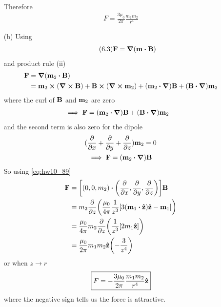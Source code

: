 \documentclass[../main.tex]{subfiles}
\begin{document}
\begin{itemize}
\begin{align*}
    \end{align*}
    Therefore
    \begin{align*}
        \boxed{F = \frac{3 \mu_0}{2\pi} \frac{m_1 m_2}{r^4}}
    \end{align*}
    \item [(b)] Using
    \begin{align*} \tag{6.3} \label{eq:hw10_3}
        \vb F = \grad(\vb m \vdot \vb B)
    \end{align*}
    and product rule (ii)
    \begin{align*}
        \vb F &= \grad(\vb m_2 \vdot \vb B) \\
        &= \vb m_2 \cross (\curl \vb B) + \vb B \cross (\curl \vb m_2) + (\vb m_2 \vdot \grad) \vb B + (\vb B \vdot \grad) \vb m_2
    \end{align*}
    where the curl of $\vb B$ and $\vb m_2$ are zero
    \begin{align*}
        \implies \vb F &= (\vb m_2 \vdot \grad) \vb B + (\vb B \vdot \grad) \vb m_2
    \end{align*}
    and the second term is also zero for the dipole
    \begin{gather*}
        (\pdv{x} + \pdv{y} + \pdv{z}) \vb m_2 = 0 \\
        \implies \vb F = (\vb m_2 \vdot \grad) \vb B
    \end{gather*}
    So using \eqref{eq:hw10_89}
    \begin{align*}
        \vb F &= \qt[(0, 0, m_2) \vdot \qt(\pdv{x}, \pdv{y}, \pdv{z})] \vb B \\
        &= m_2 \pdv{z}(\frac{\mu_0}{4\pi} \frac{1}{z^3} \qt[
            3 (\vb m_1 \vdot \vu z) \vu z - \vb m_1
        ]) \\
        &= \frac{\mu_0}{4\pi} m_2 \pdv{z}(\frac{1}{z^3} [2m_1 \vu z]) \\
        &= \frac{\mu_0}{2\pi} m_1 m_2 \vu z \qt(-\frac{3}{z^4})
    \end{align*}
    or when $z \to r$
    \begin{align*}
        \boxed{
            F = - \frac{3\mu_0}{2\pi} \frac{m_1 m_2}{r^4} \vu z
        }
    \end{align*}
    where the negative sign tells us the force is attractive.
\end{itemize}

\newpage
\end{document}
